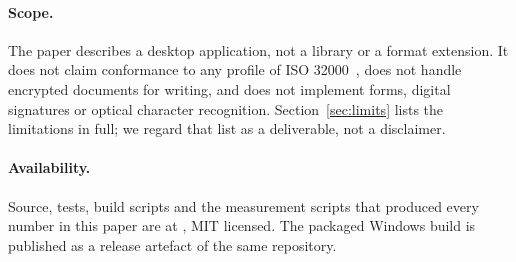\paragraph{Scope.} The paper describes a desktop application, not a library or a format
extension. It does not claim conformance to any profile of ISO 32000~\cite{iso32000}, does not
handle encrypted documents for writing, and does not implement forms, digital signatures or
optical character recognition. Section~\ref{sec:limits} lists the limitations in full; we
regard that list as a deliverable, not a disclaimer.

\paragraph{Availability.} Source, tests, build scripts and the measurement scripts that
produced every number in this paper are at \repo, MIT licensed. The packaged Windows build is
published as a release artefact of the same repository.
